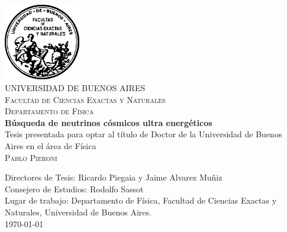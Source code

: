 \begin{titlepage}
\begin{center}


\includegraphics[width=0.25\textwidth]{fig/fceyn_logo.pdf}\\[0.5cm]    

\textsc{\large UNIVERSIDAD DE BUENOS AIRES}\\[0.5cm]

\textsc{\large Facultad de Ciencias Exactas y Naturales}\\[0.5cm]

\textsc{\large Departamento de Física }\\[2.0cm]


\textbf{\Large  Búsqueda de neutrinos cósmicos ultra energéticos}\\[1.5cm]

Tesis presentada para optar al título de Doctor de la Universidad de Buenos Aires en el área de Física\\[1.0cm]

\textsc{\Large Pablo Pieroni}\\[1.0cm]

\end{center}

\vfill

\noindent
Directores de Tesis: Ricardo Piegaia y Jaime Alvarez Mu\~niz\\
Consejero de Estudios: Rodolfo Sassot\\[0.5cm]
Lugar de trabajo: Departamento de Física, Facultad de Ciencias Exactas y Naturales, Universidad de Buenos Aires.\\[0.5cm]


\noindent
{\large \today}

\end{titlepage}